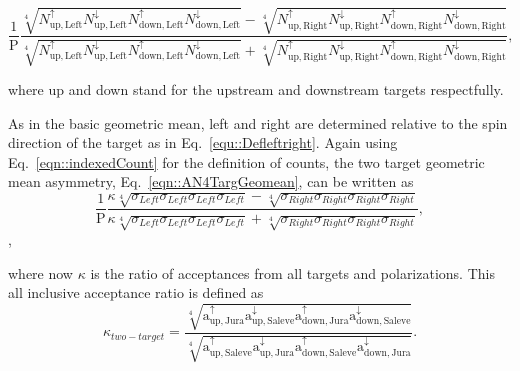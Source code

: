 \begin{equation}
  \label{eqn::AN4TargGeomean}
  \frac{1}{\mathrm{P}}
  \frac{
    \sqrt[4]{
      N_{\mathrm{up,Left}}^{\uparrow}N_{\mathrm{up, Left}}^{\downarrow}
      N_{\mathrm{down,Left}}^{\uparrow}N_{\mathrm{down, Left}}^{\downarrow}
    } -
    \sqrt[4]{
      N_{\mathrm{up,Right}}^{\uparrow}N_{\mathrm{up, Right}}^{\downarrow}
      N_{\mathrm{down,Right}}^{\uparrow}N_{\mathrm{down, Right}}^{\downarrow}
    }
  }{
    \sqrt[4]{
      N_{\mathrm{up,Left}}^{\uparrow}N_{\mathrm{up, Left}}^{\downarrow}
      N_{\mathrm{down,Left}}^{\uparrow}N_{\mathrm{down, Left}}^{\downarrow}
    } +
    \sqrt[4]{
      N_{\mathrm{up,Right}}^{\uparrow}N_{\mathrm{up, Right}}^{\downarrow}
      N_{\mathrm{down,Right}}^{\uparrow}N_{\mathrm{down, Right}}^{\downarrow}
    }
  },
\end{equation}

\noindent
where up and down stand for the upstream and downstream targets respectfully.

As in the basic geometric mean, left and right are determined relative to
the spin direction of the target as in Eq.~\ref{equ::Defleftright}.  Again using
Eq.~\ref{eqn::indexedCount} for the definition of counts, the two target
geometric mean asymmetry, Eq.~\ref{eqn::AN4TargGeomean}, can be written as
\begin{equation}
  \frac{1}{\mathrm{P}}
  \frac{
    \kappa \sqrt[4]{\sigma_{Left}\sigma_{Left}\sigma_{Left}\sigma_{Left}} -
    \sqrt[4]{\sigma_{Right}\sigma_{Right}\sigma_{Right}\sigma_{Right}}
  }{
    \kappa \sqrt[4]{\sigma_{Left}\sigma_{Left}\sigma_{Left}\sigma_{Left}} +
    \sqrt[4]{\sigma_{Right}\sigma_{Right}\sigma_{Right}\sigma_{Right}}
  },
\end{equation},

\noindent
where now $\kappa$ is the ratio of acceptances from all targets and
polarizations.  This all inclusive acceptance ratio is defined as
\begin{equation}
  \label{equ::acc4TargGeoMean}
  \kappa_{two-target} =
  \frac{
    \sqrt[4]{
      \mathrm{a}^{\uparrow}_{\mathrm{up,Jura}}
      \mathrm{a}^{\downarrow}_{\mathrm{up,Saleve}}
      \mathrm{a}^{\uparrow}_{\mathrm{down,Jura}}
      \mathrm{a}^{\downarrow}_{\mathrm{down,Saleve}}}
  }{
    \sqrt[4]{
      \mathrm{a}^{\uparrow}_{\mathrm{up,Saleve}}
      \mathrm{a}^{\downarrow}_{\mathrm{up,Jura}}
      \mathrm{a}^{\uparrow}_{\mathrm{down,Saleve}}
      \mathrm{a}^{\downarrow}_{\mathrm{down,Jura}}}
  }.
\end{equation}

